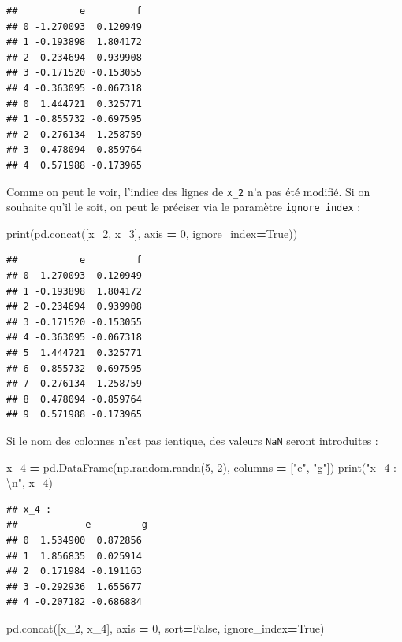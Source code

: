 \documentclass[
  12pt,
]{book}
\newenvironment{Shaded}{\begin{snugshade}}{\end{snugshade}}
\newcommand{\BuiltInTok}[1]{#1}
\newcommand{\CharTok}[1]{\textcolor[rgb]{0.31,0.60,0.02}{#1}}
\newcommand{\DecValTok}[1]{\textcolor[rgb]{0.00,0.00,0.81}{#1}}
\newcommand{\NormalTok}[1]{#1}
\newcommand{\OperatorTok}[1]{\textcolor[rgb]{0.81,0.36,0.00}{\textbf{#1}}}
\newcommand{\StringTok}[1]{\textcolor[rgb]{0.31,0.60,0.02}{#1}}
\newcommand{\VariableTok}[1]{\textcolor[rgb]{0.00,0.00,0.00}{#1}}
\numberwithin{equation}{section}
\numberwithin{countremarque}{section}
\begin{document}
\begin{lstlisting}
##           e         f
## 0 -1.270093  0.120949
## 1 -0.193898  1.804172
## 2 -0.234694  0.939908
## 3 -0.171520 -0.153055
## 4 -0.363095 -0.067318
## 0  1.444721  0.325771
## 1 -0.855732 -0.697595
## 2 -0.276134 -1.258759
## 3  0.478094 -0.859764
## 4  0.571988 -0.173965
\end{lstlisting}

Comme on peut le voir, l'indice des lignes de \texttt{x\_2} n'a pas été modifié. Si on souhaite qu'il le soit, on peut le préciser via le paramètre \texttt{ignore\_index} :

\begin{Shaded}
\begin{Highlighting}[]
\BuiltInTok{print}\NormalTok{(pd.concat([x\_2, x\_3], axis }\OperatorTok{=} \DecValTok{0}\NormalTok{, ignore\_index}\OperatorTok{=}\VariableTok{True}\NormalTok{))}
\end{Highlighting}
\end{Shaded}

\begin{lstlisting}
##           e         f
## 0 -1.270093  0.120949
## 1 -0.193898  1.804172
## 2 -0.234694  0.939908
## 3 -0.171520 -0.153055
## 4 -0.363095 -0.067318
## 5  1.444721  0.325771
## 6 -0.855732 -0.697595
## 7 -0.276134 -1.258759
## 8  0.478094 -0.859764
## 9  0.571988 -0.173965
\end{lstlisting}

Si le nom des colonnes n'est pas ientique, des valeurs \texttt{NaN} seront introduites :

\begin{Shaded}
\begin{Highlighting}[]
\NormalTok{x\_4 }\OperatorTok{=}\NormalTok{ pd.DataFrame(np.random.randn(}\DecValTok{5}\NormalTok{, }\DecValTok{2}\NormalTok{),}
\NormalTok{                   columns }\OperatorTok{=}\NormalTok{ [}\StringTok{"e"}\NormalTok{, }\StringTok{"g"}\NormalTok{])}
\BuiltInTok{print}\NormalTok{(}\StringTok{"x\_4 : }\CharTok{\textbackslash{}n}\StringTok{"}\NormalTok{, x\_4)}
\end{Highlighting}
\end{Shaded}

\begin{lstlisting}
## x_4 : 
##            e         g
## 0  1.534900  0.872856
## 1  1.856835  0.025914
## 2  0.171984 -0.191163
## 3 -0.292936  1.655677
## 4 -0.207182 -0.686884
\end{lstlisting}

\begin{Shaded}
\begin{Highlighting}[]
\NormalTok{pd.concat([x\_2, x\_4], axis }\OperatorTok{=} \DecValTok{0}\NormalTok{, sort}\OperatorTok{=}\VariableTok{False}\NormalTok{, ignore\_index}\OperatorTok{=}\VariableTok{True}\NormalTok{)}
\end{Highlighting}
\end{Shaded}
\end{document}
